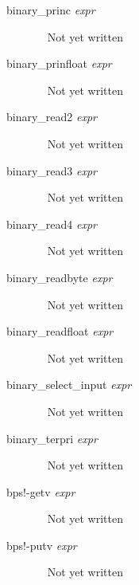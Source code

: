 \documentclass[a4paper,11pt]{article}
\begin{document}
\begin{description}
\item [{\ttfamily binary\_princ} {\itshape  expr}]  ~\newline
Not yet written

\item [{\ttfamily binary\_prinfloat} {\itshape  expr}]  ~\newline
Not yet written

\item [{\ttfamily binary\_read2} {\itshape  expr}]  ~\newline
Not yet written

\item [{\ttfamily binary\_read3} {\itshape  expr}]  ~\newline
Not yet written

\item [{\ttfamily binary\_read4} {\itshape  expr}]  ~\newline
Not yet written

\item [{\ttfamily binary\_readbyte} {\itshape  expr}]  ~\newline
Not yet written

\item [{\ttfamily binary\_readfloat} {\itshape  expr}]  ~\newline
Not yet written

\item [{\ttfamily binary\_select\_input} {\itshape  expr}]  ~\newline
Not yet written

\item [{\ttfamily binary\_terpri} {\itshape  expr}]  ~\newline
Not yet written

\item [{\ttfamily bps!-getv} {\itshape  expr}]  ~\newline
Not yet written

\item [{\ttfamily bps!-putv} {\itshape  expr}]  ~\newline
Not yet written


\end{description}
\end{document}
